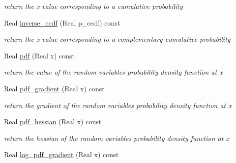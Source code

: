 \begin{DoxyCompactItemize}
\begin{DoxyCompactList}\small\item\em return the x value corresponding to a cumulative probability \end{DoxyCompactList}\item 
Real \hyperlink{classPecos_1_1UniformRandomVariable_afda003a1f59ff6930902cd5c8601f49b}{inverse\+\_\+ccdf} (Real p\+\_\+ccdf) const \label{classPecos_1_1UniformRandomVariable_afda003a1f59ff6930902cd5c8601f49b}

\begin{DoxyCompactList}\small\item\em return the x value corresponding to a complementary cumulative probability \end{DoxyCompactList}\item 
Real \hyperlink{classPecos_1_1UniformRandomVariable_a8ec69265f428e17c1707133cb137a819}{pdf} (Real x) const \label{classPecos_1_1UniformRandomVariable_a8ec69265f428e17c1707133cb137a819}

\begin{DoxyCompactList}\small\item\em return the value of the random variable\textquotesingle{}s probability density function at x \end{DoxyCompactList}\item 
Real \hyperlink{classPecos_1_1UniformRandomVariable_aaa7ca3718abc034be7629af5594efca0}{pdf\+\_\+gradient} (Real x) const \label{classPecos_1_1UniformRandomVariable_aaa7ca3718abc034be7629af5594efca0}

\begin{DoxyCompactList}\small\item\em return the gradient of the random variable\textquotesingle{}s probability density function at x \end{DoxyCompactList}\item 
Real \hyperlink{classPecos_1_1UniformRandomVariable_a514a0abe97269ac6e003f43683d9137e}{pdf\+\_\+hessian} (Real x) const \label{classPecos_1_1UniformRandomVariable_a514a0abe97269ac6e003f43683d9137e}

\begin{DoxyCompactList}\small\item\em return the hessian of the random variable\textquotesingle{}s probability density function at x \end{DoxyCompactList}\item 
Real \hyperlink{classPecos_1_1UniformRandomVariable_a5ccc16c04690f0c501f44c1ffae2bbd1}{log\+\_\+pdf\+\_\+gradient} (Real x) const \label{classPecos_1_1UniformRandomVariable_a5ccc16c04690f0c501f44c1ffae2bbd1}


\end{DoxyCompactItemize}
